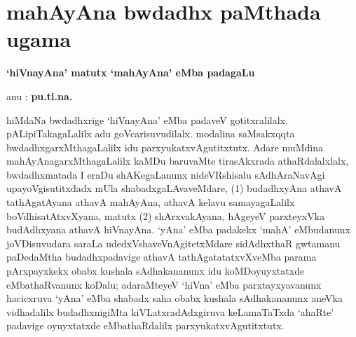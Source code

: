 \makeatletter
\def\@makechapterhead#1{%
  \vspace*{10\p@}%
{\fontsize{13pt}{13pt}\selectfont\raggedright{\bf naLinAkaSxdatf}\par}
\vspace*{25\p@}%
  {\parindent \z@ \centering \normalfont
    \ifnum \c@secnumdepth >\m@ne
      \if@mainmatter
        {\LARGE\bfseries  #1}\par\nobreak
	\vskip 4pt
      \fi
    \fi
\smallskip 

  }
\vskip 10\p@}
\makeatother

\chapter{mahAyAna bwdadhx paMthada ugama}

\setcounter{endnote}{0}

\begin{center}
{\textbf{\Large `hiVnayAna' matutx `mahAyAna' eMba padagaLu}}
\end{center}

\hfill {anu : {\bf pu.ti.na.}}

\bigskip
\bigskip

\noindent
hiMdaNa bwdadhxrige `hiVnayAna' eMba padaveV gotitxralilalx. pALipiTakagaLalilx adu goVcarisuvudilalx. modalina saMsakxqqta bwdadhxgarxMthagaLalilx idu parxyukatxvAgutitxtutx. Adare muMdina mahAyAnagarxMthagaLalilx kaMDu baruvaMte tirasAkxrada athaRdalalxlalx, bwdadhxmatada I eraDu shAKegaLanunx nideVRshisalu sAdhAraNavAgi upayoVgisutitxdadx mUla shabadxgaLAvaveMdare,
(1) budadhxyAna athavA tathAgatAyana athavA mahAyAna, athavA kelavu samayagaLalilx boVdhisatAtxvXyana, matutx
(2) shArxvakAyana, hAgeyeV parxteyxVka budAdhxyana athavA hiVnayAna.
`yAna' eMba padakekx `mahA' eMbudanunx joVDisuvudara saraLa udedxVsha\-veVnAgitetxMdare sidAdhxthaR gwtamanu paDedaMtha budadhxpadavige athavA tathAgatatatxvXveMba parama pArxpayxkekx obabx kushala sAdhakananunx idu koMDoyuyxtatxde eMbathaRvanunx koDalu; adaraMteyeV `hiVna' eMba parxtayxyavanunx hacicxruva `yAna' eMba shabadx saha obabx kushala sAdhakananunx aneVka vidhadalilx budadhxnigiMta  kiVLatxradAdxgiruva keLamaTaTxda `ahaRte' padavige oyuyxtatxde eMbathaRdalilx parxyukatxvAgutitxtutx.


